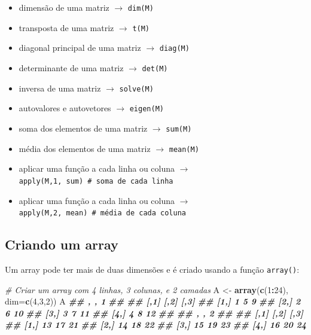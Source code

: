 \documentclass[
]{book}
\newenvironment{Shaded}{\begin{snugshade}}{\end{snugshade}}
\newcommand{\AttributeTok}[1]{\textcolor[rgb]{0.13,0.29,0.53}{#1}}
\newcommand{\CommentTok}[1]{\textcolor[rgb]{0.56,0.35,0.01}{\textit{#1}}}
\newcommand{\DecValTok}[1]{\textcolor[rgb]{0.00,0.00,0.81}{#1}}
\newcommand{\DocumentationTok}[1]{\textcolor[rgb]{0.56,0.35,0.01}{\textbf{\textit{#1}}}}
\newcommand{\FunctionTok}[1]{\textcolor[rgb]{0.13,0.29,0.53}{\textbf{#1}}}
\newcommand{\NormalTok}[1]{#1}
\newcommand{\OtherTok}[1]{\textcolor[rgb]{0.56,0.35,0.01}{#1}}
\newcommand{\SpecialCharTok}[1]{\textcolor[rgb]{0.81,0.36,0.00}{\textbf{#1}}}
\begin{document}
\begin{itemize}
\item
  dimensão de uma matriz \(\to\) \texttt{dim(M)}
\item
  transposta de uma matriz \(\to\) \texttt{t(M)}
\item
  diagonal principal de uma matriz \(\to\) \texttt{diag(M)}
\item
  determinante de uma matriz \(\to\) \texttt{det(M)}
\item
  inversa de uma matriz \(\to\) \texttt{solve(M)}
\item
  autovalores e autovetores \(\to\) \texttt{eigen(M)}
\item
  soma dos elementos de uma matriz \(\to\) \texttt{sum(M)}
\item
  média dos elementos de uma matriz \(\to\) \texttt{mean(M)}
\item
  aplicar uma função a cada linha ou coluna \(\to\)
  \texttt{apply(M,1,\ sum)\ \#\ soma\ de\ cada\ linha}
\item
  aplicar uma função a cada linha ou coluna \(\to\)
  \texttt{apply(M,2,\ mean)\ \#\ média\ de\ cada\ coluna}
\end{itemize}

\subsection{Criando um array}\label{criando-um-array}

Um array pode ter mais de duas dimensões e é criado usando a função
\texttt{array()}:

\begin{Shaded}
\begin{Highlighting}[]
\CommentTok{\# Criar um array com 4 linhas, 3 colunas, e 2 camadas}
\NormalTok{A }\OtherTok{\textless{}{-}} \FunctionTok{array}\NormalTok{(}\FunctionTok{c}\NormalTok{(}\DecValTok{1}\SpecialCharTok{:}\DecValTok{24}\NormalTok{), }\AttributeTok{dim=}\FunctionTok{c}\NormalTok{(}\DecValTok{4}\NormalTok{,}\DecValTok{3}\NormalTok{,}\DecValTok{2}\NormalTok{))}
\NormalTok{A}
\DocumentationTok{\#\# , , 1}
\DocumentationTok{\#\# }
\DocumentationTok{\#\#      [,1] [,2] [,3]}
\DocumentationTok{\#\# [1,]    1    5    9}
\DocumentationTok{\#\# [2,]    2    6   10}
\DocumentationTok{\#\# [3,]    3    7   11}
\DocumentationTok{\#\# [4,]    4    8   12}
\DocumentationTok{\#\# }
\DocumentationTok{\#\# , , 2}
\DocumentationTok{\#\# }
\DocumentationTok{\#\#      [,1] [,2] [,3]}
\DocumentationTok{\#\# [1,]   13   17   21}
\DocumentationTok{\#\# [2,]   14   18   22}
\DocumentationTok{\#\# [3,]   15   19   23}
\DocumentationTok{\#\# [4,]   16   20   24}
\end{Highlighting}
\end{Shaded}
\end{document}

